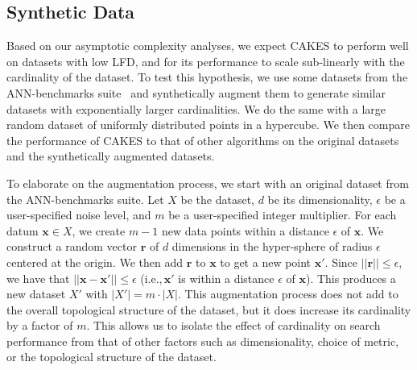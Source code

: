 \subsection{Synthetic Data}
\label{sec:methods:synthetic-data}

Based on our asymptotic complexity analyses, we expect CAKES to perform well on datasets with low LFD, and for its performance to scale sub-linearly with the cardinality of the dataset.
To test this hypothesis, we use some datasets from the ANN-benchmarks suite~\cite{aumuller2020ann} and synthetically augment them to generate similar datasets with exponentially larger cardinalities.
We do the same with a large random dataset of uniformly distributed points in a hypercube.
We then compare the performance of CAKES to that of other algorithms on the original datasets and the synthetically augmented datasets.

To elaborate on the augmentation process, we start with an original dataset from the ANN-benchmarks suite.
Let $X$ be the dataset, $d$ be its dimensionality, $\epsilon$ be a user-specified noise level, and $m$ be a user-specified integer multiplier.
For each datum $\mathbf{x} \in X$, we create $m - 1$ new data points within a distance $\epsilon$ of $\mathbf{x}$.
We construct a random vector $\mathbf{r}$ of $d$ dimensions in the hyper-sphere of radius $\epsilon$ centered at the origin.
We then add $\mathbf{r}$ to $\mathbf{x}$ to get a new point $\mathbf{x}'$.
Since $||\mathbf{r}|| \leq \epsilon$, we have that $||\mathbf{x} - \mathbf{x}'|| \leq \epsilon$ (i.e.,\,$\mathbf{x}'$ is within a distance $\epsilon$ of $\mathbf{x}$).
This produces a new dataset $X'$ with $|X'| = m \cdot |X|$.
This augmentation process does not add to the overall topological structure of the dataset, but it does increase its cardinality by a factor of $m$.
This allows us to isolate the effect of cardinality on search performance from that of other factors such as dimensionality, choice of metric, or the topological structure of the dataset.
